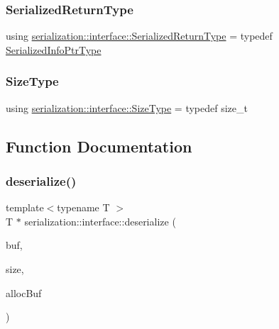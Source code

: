 \subsubsection{\texorpdfstring{Serialized\+Return\+Type}{SerializedReturnType}}
{\footnotesize\ttfamily using \hyperlink{namespaceserialization_1_1interface_a53410d9804c330ddfaf562ddc8e3c681}{serialization\+::interface\+::\+Serialized\+Return\+Type} = typedef \hyperlink{namespaceserialization_1_1interface_ab3413aa784e985f68876637844866ba1}{Serialized\+Info\+Ptr\+Type}}

\mbox{\label{namespaceserialization_1_1interface_a2ffaaa9b168f9cbcfe454ab036444403}} 
\subsubsection{\texorpdfstring{Size\+Type}{SizeType}}
{\footnotesize\ttfamily using \hyperlink{namespaceserialization_1_1interface_a2ffaaa9b168f9cbcfe454ab036444403}{serialization\+::interface\+::\+Size\+Type} = typedef size\+\_\+t}



\subsection{Function Documentation}
\mbox{\label{namespaceserialization_1_1interface_a56fb462f661704f6e4fe3ebc77f429a1}} 
\subsubsection{\texorpdfstring{deserialize()}{deserialize()}}
{\footnotesize\ttfamily template$<$typename T $>$ \\
T $\ast$ serialization\+::interface\+::deserialize (\begin{DoxyParamCaption}\item[{\hyperlink{namespaceserialization_1_1interface_a718748616a908c35e6080b71d7790a76}{Serial\+Byte\+Type} $\ast$}]{buf,  }\item[{\hyperlink{namespaceserialization_1_1interface_a2ffaaa9b168f9cbcfe454ab036444403}{Size\+Type}}]{size,  }\item[{T $\ast$}]{alloc\+Buf }\end{DoxyParamCaption})}

